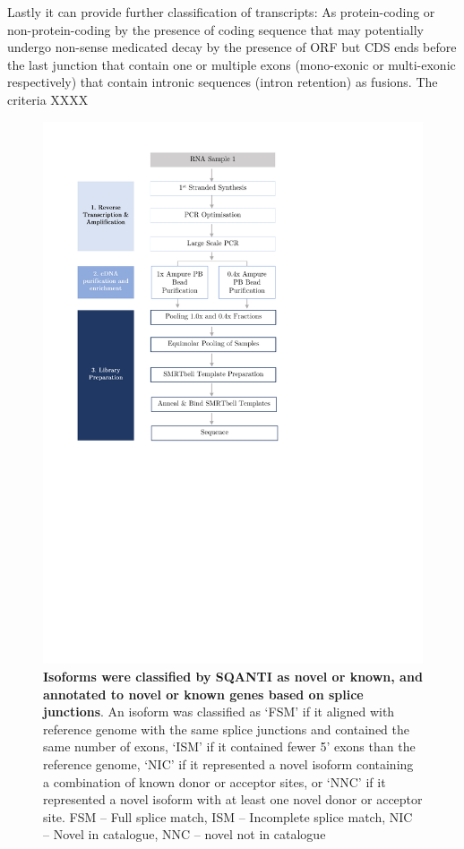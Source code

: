 Lastly it can provide further classification of transcripts:  
As protein-coding or non-protein-coding by the presence of coding sequence
that may potentially undergo non-sense medicated decay by the presence of ORF but CDS ends before the last junction
that contain one or multiple exons (mono-exonic or multi-exonic respectively)
that contain intronic sequences (intron retention) 
as fusions. The criteria XXXX

\begin{figure}[htp]
	\begin{center}
		\includegraphics[page=3,trim={2cm 28cm 2cm 5cm},clip,scale = 0.8]{Figures/ProjectDevelopment_Figures}
	\end{center}
	\captionsetup{width=0.95\textwidth}
	\caption[Isoform Classifications by SQANTI]%
	{\textbf{Isoforms were classified by SQANTI as novel or known, and annotated to novel or known genes based on splice junctions}. An isoform was classified as ‘FSM’ if it aligned with reference genome with the same splice junctions and contained the same number of exons, ‘ISM’ if it contained fewer 5’ exons than the reference genome, ‘NIC’ if it represented a novel isoform containing a combination of known donor or acceptor sites, or ‘NNC’ if it represented a novel isoform with at least one novel donor or acceptor site. FSM – Full splice match, ISM – Incomplete splice match, NIC – Novel in catalogue, NNC – novel not in catalogue}
	\label{fig:sqanti_cate}
\end{figure}


